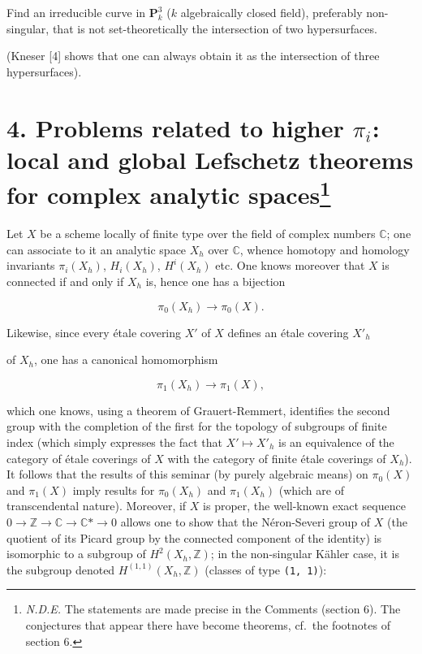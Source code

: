 \documentclass[
  11pt,
  a4paper,
]{book}
\begin{document}
Find an irreducible curve in \(\mathbf{P}^{3}_{k}\) (\(k\) algebraically
closed field), preferably non-singular, that is not set-theoretically
the intersection of two hypersurfaces.

(Kneser {[}4{]} shows that one can always obtain it as the intersection
of three hypersurfaces).

\section[4. Problems related to higher \(\pi_{i}\): local and global
Lefschetz theorems for complex analytic spaces]{\texorpdfstring{4.
Problems related to higher \(\pi_{i}\): local and global Lefschetz
theorems for complex analytic
spaces\footnote{\emph{N.D.E.} The statements are made precise in the
  Comments (section 6). The conjectures that appear there have become
  theorems, cf.~the footnotes of section 6.}}{4. Problems related to higher \textbackslash pi\_\{i\}: local and global Lefschetz theorems for complex analytic spaces}}\label{problems-related-to-higher-pi_i-local-and-global-lefschetz-theorems-for-complex-analytic-spacesn.d.e-xiii-11}

Let \(X\) be a scheme locally of finite type over the field of complex
numbers \(\mathbb{C}\); one can associate to it an analytic space
\(X_{h}\) over \(\mathbb{C}\), whence homotopy and homology invariants
\(\pi_{i}(X_{h})\), \(H_{i}(X_{h})\), \(H^{i}(X_{h})\) etc. One knows
moreover that \(X\) is connected if and only if \(X_{h}\) is, hence one
has a bijection

\[ \pi_{0}(X_{h}) \to \pi_{0}(X). \]

Likewise, since every étale covering \(X'\) of \(X\) defines an étale
covering \(X'_{h}\)

of \(X_{h}\), one has a canonical homomorphism

\[ \pi_{1}(X_{h}) \to \pi_{1}(X), \]

which one knows, using a theorem of Grauert-Remmert, identifies the
second group with the completion of the first for the topology of
subgroups of finite index (which simply expresses the fact that
\(X' \mapsto X'_{h}\) is an equivalence of the category of étale
coverings of \(X\) with the category of finite étale coverings of
\(X_{h}\)). It follows that the results of this seminar (by purely
algebraic means) on \(\pi_{0}(X)\) and \(\pi_{1}(X)\) imply results for
\(\pi_{0}(X_{h})\) and \(\pi_{1}(X_{h})\) (which are of transcendental
nature). Moreover, if \(X\) is proper, the well-known exact sequence \(0
\to \mathbb{Z} \to \mathbb{C} \to \mathbb{C}* \to 0\) allows one to show
that the Néron-Severi group of \(X\) (the quotient of its Picard group
by the connected component of the identity) is isomorphic to a subgroup
of \(H^{2}(X_{h},
\mathbb{Z})\); in the non-singular Kähler case, it is the subgroup
denoted \(H^{(1,1)}(X_{h}, \mathbb{Z})\) (classes of type
\texttt{(1,\ 1)}):
\end{document}
